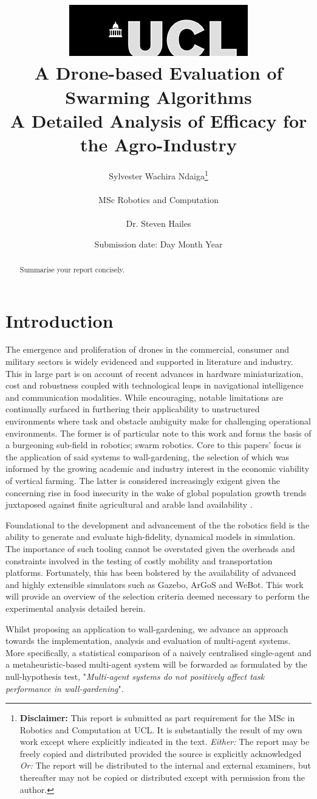 \documentclass{report}
\title{  	{ \includegraphics[scale=.5]{ucl_logo.png} }\\
{{\Huge A Drone-based Evaluation of Swarming Algorithms}}\\
{\large A Detailed Analysis of Efficacy for the Agro-Industry}\\
		}
\date{Submission date: Day Month Year}
\author{Sylvester Wachira Ndaiga\thanks{
{\bf Disclaimer:}
This report is submitted as part requirement for the MSc in Robotics and Computation at UCL. It is
substantially the result of my own work except where explicitly indicated in the text.
\emph{Either:} The report may be freely copied and distributed provided the source is explicitly acknowledged
\newline  %
\emph{Or:}\newline
The report will be distributed to the internal and external examiners, but thereafter may not be copied or distributed except with permission from the author.}
\\ \\
MSc Robotics and Computation\\ \\
Dr. Steven Hailes}
\begin{document}
 
\onehalfspacing
\maketitle
\begin{abstract}
Summarise your report concisely.
\end{abstract}
\tableofcontents
\setcounter{page}{1}

\chapter{Introduction}

The emergence and proliferation of drones in the commercial, consumer and military sectors is widely evidenced and supported in literature and industry. This in large part is on account of recent advances in hardware miniaturization, cost and robustness coupled with technological leaps in navigational intelligence and communication modalities. While encouraging, notable limitations are continually surfaced in furthering their applicability to unstructured environments where task and obstacle ambiguity make for challenging operational environments. The former is of particular note to this work and forms the basis of a burgeoning sub-field in robotics; swarm robotics. Core to this papers' focus is the application of said systems to wall-gardening, the selection of which was informed by the growing academic and industry \cite{gmi_2017} interest in the economic viability of vertical farming. The latter is considered increasingly exigent given the concerning rise in food insecurity in the wake of global population growth trends juxtaposed against finite agricultural and arable land availability \cite{Banerjee2014}.

Foundational to the development and advancement of the the robotics field is the ability to generate and evaluate high-fidelity, dynamical models in simulation. The importance of such tooling cannot be overstated given the overheads and constraints involved in the testing of costly mobility and transportation platforms. Fortunately, this has been bolstered by the availability of advanced and highly extensible simulators such as Gazebo, ArGoS \cite{Pinciroli2014} and WeBot. This work will provide an overview of the selection criteria deemed necessary to perform the experimental analysis detailed herein. 

Whilst proposing an application to wall-gardening, we advance an approach towards the implementation, analysis and evaluation of multi-agent systems. More specifically, a statistical comparison of a naively centralised single-agent and a metaheuristic-based multi-agent system will be forwarded as formulated by the null-hypothesis test, "\textit{Multi-agent systems do not positively affect task performance in wall-gardening}".
\end{document}
